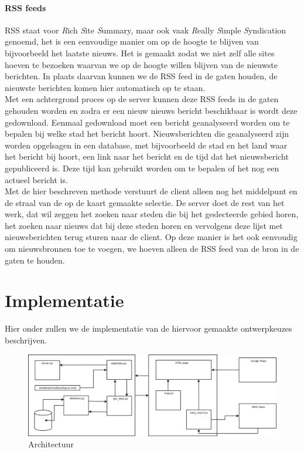 \documentclass[twoside,openright]{uva-bachelor-thesis}
\begin{document}
		\subsubsection{RSS feeds}
			RSS staat voor \textit{R}ich \textit{S}ite \textit{S}ummary, maar ook vaak \textit{R}eally \textit{S}imple \textit{S}yndication genoemd, het is een eenvoudige manier om op de hoogte te blijven van bijvoorbeeld het laatste nieuws. Het is gemaakt zodat we niet zelf alle sites hoeven te bezoeken waarvan we op de hoogte willen blijven van de nieuwste berichten. In plaats daarvan kunnen we de RSS feed in de gaten houden, de nieuwste berichten komen hier automatisch op te staan.
			\\[0.5cm]
		Met een achtergrond proces op de server kunnen deze RSS feeds in de gaten gehouden worden en zodra er een nieuw nieuws bericht beschikbaar is wordt deze gedownload. Eenmaal gedownload moet een bericht geanalyseerd worden om te bepalen bij welke stad het bericht hoort. Nieuwsberichten die geanalyseerd zijn worden opgelsagen in een database, met bijvoorbeeld de stad en het land waar het bericht bij hoort, een link naar het bericht en de tijd dat het nieuwsbericht gepubliceerd is. Deze tijd kan gebruikt worden om te bepalen of het nog een actueel bericht is.
		\\[0.5cm]
		Met de hier beschreven methode verstuurt de client alleen nog het middelpunt en de straal van de op de kaart gemaakte selectie. De server doet de rest van het werk, dat wil zeggen het zoeken naar steden die bij het geslecteerde gebied horen, het zoeken naar nieuws dat bij deze steden horen en vervolgens deze lijst met nieuwsberichten terug sturen naar de client. Op deze manier is het ook eenvoudig om nieuwsbronnen toe te voegen, we hoeven alleen de RSS feed van de bron in de gaten te houden.
\chapter{Implementatie}
	Hier onder zullen we de implementatie van de hiervoor gemaakte ontwerpkeuzes beschrijven.
	\begin{figure}[!htb]
		\label{fig:arch}
		\centering
		\includegraphics[scale=0.3]{./img/architecture.png}
		\caption{Architectuur}
	\end{figure}
\end{document}
